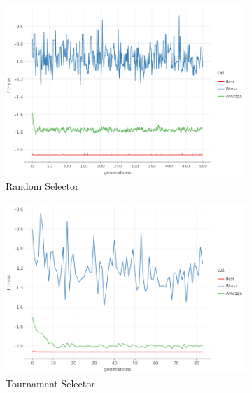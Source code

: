     \begin{figure}[ht!]
        \centering
        \begin{subfigure}{.45\textwidth}
            \centering  
            \includegraphics[width=\linewidth]{img/cross_in_tray_random.png}
            \caption{Random Selector}
        \end{subfigure}
        \begin{subfigure}{.45\textwidth}
            \centering
            \includegraphics[width=\linewidth]{img/cross_in_tray_tournament.png}
            \caption{Tournament Selector}
        \end{subfigure}
        \begin{subfigure}{.45\textwidth}
            \centering

\end{subfigure}
\end{figure}
